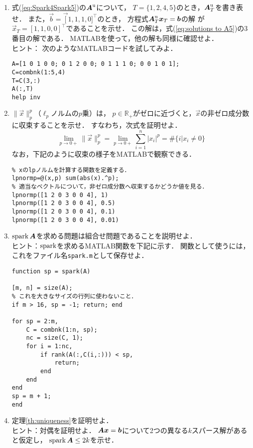 \begin{enumerate}
\item
式(\ref{eq:Spark4Spark5})の$\mbox{\boldmath $A$}^{\mbox{\scriptsize u}}$について，
$T=\{1,2,4,5\}$のとき，$\mbox{\boldmath $A$}_T^{\mbox{\scriptsize u}}$を書き表せ．
また，$\vec b=\vec [1,1,1,0]^\top$のとき，
方程式$\mbox{\boldmath $A$}_T^{\mbox{\scriptsize u}}\mbox{\boldmath $x$}_T=\mbox{\boldmath $b$}$の解
が$\vec x_T=[1,1,0,0]^\top$であることを示せ．
この解は，式(\ref{eq:solutions to A5})の3番目の解である．
MATLABを使って，他の解も同様に確認せよ．\\
ヒント：
次のようなMATLABコードを試してみよ．
\begin{lstlisting}
A=[1 0 1 0 0; 0 1 2 0 0; 0 1 1 1 0; 0 0 1 0 1];
C=combnk(1:5,4)
T=C(3,:)
A(:,T)
help inv
\end{lstlisting}

\item
\label{ex:l0 norm}
$\|\vec x\|_p^p$（$\ell_p$ノルムの$p$乗）は，
$p\in\mathbb{R}_+$がゼロに近づくと，$\vec x$の非ゼロ成分数に収束することを示せ．
すなわち，次式を証明せよ．
\begin{equation}
\lim_{p\rightarrow 0+}\|\vec x\|_p^p
=\lim_{p\rightarrow 0+}\sum_{i=1}^n|x_i|^p
=\#\{i|x_i\neq 0\}
\end{equation}
なお，下記のように収束の様子をMATLABで観察できる．
\begin{lstlisting}
% xのlpノルムを計算する関数を定義する．
lpnormp=@(x,p) sum(abs(x).^p);
% 適当なベクトルについて，非ゼロ成分数へ収束するかどうか値を見る．
lpnormp([1 2 0 3 0 0 4], 1)
lpnormp([1 2 0 3 0 0 4], 0.5)
lpnormp([1 2 0 3 0 0 4], 0.1)
lpnormp([1 2 0 3 0 0 4], 0.01)
\end{lstlisting}

\item
\label{ex:spark is comb}
$\mathop{\textrm{spark}}\nolimits\mbox{\boldmath $A$}$を求める問題は組合せ問題であることを説明せよ．\\
ヒント：$\mathop{\textrm{spark}}\nolimits$を求めるMATLAB関数を下記に示す．
関数として使うには，これをファイル名{\tt spark.m}として保存せよ．
\begin{lstlisting}
function sp = spark(A)

[m, n] = size(A);
% これを大きなサイズの行列に使わないこと．
if m > 16, sp = -1; return; end

for sp = 2:m,
    C = combnk(1:n, sp);
    nc = size(C, 1);
    for i = 1:nc,
        if rank(A(:,C(i,:))) < sp,
            return;
        end
    end
end
sp = m + 1;
end
\end{lstlisting}


\item
\label{ex:uniqueness}
定理\ref{th:uniqueness}を証明せよ．\\
ヒント：対偶を証明せよ．
$\mbox{\boldmath $A$}\mbox{\boldmath $x$}=\mbox{\boldmath $b$}$について2つの異なる$k$スパース解があると仮定し，
$\mathop{\textrm{spark}}\nolimits\mbox{\boldmath $A$}\leq 2k$を示せ．


\end{enumerate}
